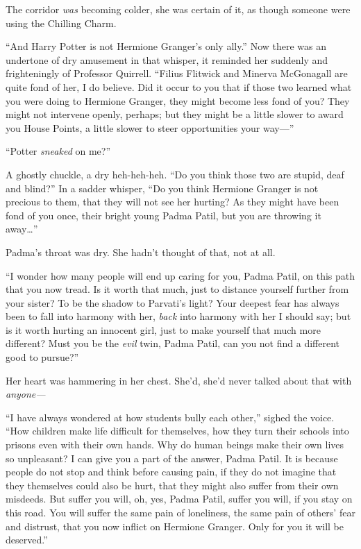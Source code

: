 The corridor \emph{was} becoming colder, she was certain of it, as though someone were using the Chilling Charm.

“And Harry Potter is not Hermione Granger’s only ally.” Now there was an undertone of dry amusement in that whisper, it reminded her suddenly and frighteningly of Professor Quirrell. “Filius Flitwick and Minerva McGonagall are quite fond of her, I do believe. Did it occur to you that if those two learned what you were doing to Hermione Granger, they might become less fond of you? They might not intervene openly, perhaps; but they might be a little slower to award you House Points, a little slower to steer opportunities your way—”

“Potter \emph{sneaked} on me?”

A ghostly chuckle, a dry heh-heh-heh. “Do you think those two are stupid, deaf and blind?” In a sadder whisper, “Do you think Hermione Granger is not precious to them, that they will not see her hurting? As they might have been fond of you once, their bright young Padma Patil, but you are throwing it away…”

Padma’s throat was dry. She hadn’t thought of that, not at all.

“I wonder how many people will end up caring for you, Padma Patil, on this path that you now tread. Is it worth that much, just to distance yourself further from your sister? To be the shadow to Parvati’s light? Your deepest fear has always been to fall into harmony with her, \emph{back} into harmony with her I should say; but is it worth hurting an innocent girl, just to make yourself that much more different? Must you be the \emph{evil} twin, Padma Patil, can you not find a different good to pursue?”

Her heart was hammering in her chest. She’d, she’d never talked about that with \emph{anyone—}

“I have always wondered at how students bully each other,” sighed the voice. “How children make life difficult for themselves, how they turn their schools into prisons even with their own hands. Why do human beings make their own lives so unpleasant? I can give you a part of the answer, Padma Patil. It is because people do not stop and think before causing pain, if they do not imagine that they themselves could also be hurt, that they might also suffer from their own misdeeds. But suffer you will, oh, yes, Padma Patil, suffer you will, if you stay on this road. You will suffer the same pain of loneliness, the same pain of others’ fear and distrust, that you now inflict on Hermione Granger. Only for you it will be deserved.”

